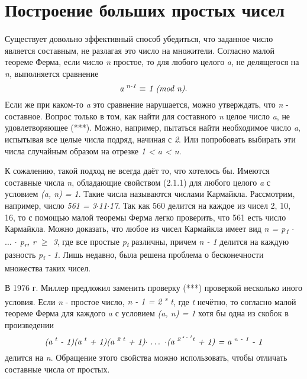 \section{Построение больших простых чисел}

\paragraph{} Существует довольно эффективный способ убедиться, что заданное число является составным, не разлагая это число на множители. 
Согласно малой теореме Ферма, если число \textit{n} простое, то для любого целого \textit{a}, не делящегося на \textit{n}, выполняется сравнение
\begin{equation}
 \textit{a\textsuperscript{ n-1} {$\equiv$} 1 (mod n)}.
\end{equation}
Если же при каком-то \textit{a} это сравнение нарушается, можно утверждать, что \textit{n} - составное. Вопрос только в том, как найти для составного \textit{n}
целое число \textit{a}, не удовлетворяющее (***). Можно, например, пытаться найти необходимое число \textit{a}, испытывая все целые числа подряд, 
начиная с \textit{2}. Или попробовать выбирать эти числа случайным образом на отрезке \textit{1 < a < n}.

  К сожалению, такой подход не всегда даёт то, что хотелось бы. Имеются составные числа \textit{n}, обладающие свойством (2.1.1) для любого целого
\textit{a} с условием \textit{(a, n) = 1}. Такие числа называются числами Кармайкла. Рассмотрим, например, число \textit{561 = 3{$\cdot$}11{$\cdot$}17}. 
Так как 560 делится на каждое из чисел 2, 10, 16, то с помощью малой теоремы Ферма легко проверить, что 561 есть число Кармайкла. 
Можно доказать, что любое из чисел Кармайкла имеет вид \textit{n = p\textsubscript{1} {$\cdot$} {$\dots$} {$\cdot$} p\textsubscript{r}, r {$\geq$} 3}, 
где все простые \textit{p\textsubscript{i}} различны, причем \textit{n - 1} делится на каждую разность \textit{p\textsubscript{i} - 1}. 
Лишь недавно, была решена проблема о бесконечности множества таких чисел.

  В 1976 г. Миллер предложил заменить проверку (***) проверкой несколько иного условия. Если \textit{n} - простое число, 
\textit{n - 1 = 2\textsuperscript{ s} t}, где \textit{t} нечётно, то согласно малой теореме Ферма для каждого \textit{a} с 
условием \textit{(a, n) = 1} хотя бы одна из скобок в произведении
\begin{equation}
 \textit{(a\textsuperscript{ t} - 1)(a\textsuperscript{ t} + 1)(a\textsuperscript{ 2 t} + 1){$\cdot$} {$\dots$} {$\cdot$}(a\textsuperscript{ 2\textsuperscript{ s - 1}t} + 1) = a\textsuperscript{ n - 1} - 1}
\end{equation}
делится на \textit{n}. Обращение этого свойства можно использовать, чтобы отличать составные числа от простых.

